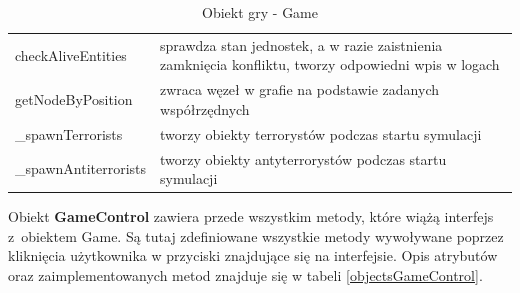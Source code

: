 \begin{table}
\begin{center}
\begin{tabular}{|p{}|p{}|}
	checkAliveEntities & sprawdza stan jednostek, a w razie zaistnienia zamknięcia konfliktu, tworzy odpowiedni wpis w logach\\
	getNodeByPosition & zwraca węzeł w grafie na podstawie zadanych współrzędnych\\
	\_spawnTerrorists & tworzy obiekty terrorystów podczas startu symulacji\\ 
	\_spawnAntiterrorists & tworzy obiekty antyterrorystów podczas startu symulacji
\\\hline
\end{tabular}
\caption {Obiekt gry - Game\label{objectsGame}}
\end{center}
\end{table} 

Obiekt \textbf{GameControl} zawiera przede wszystkim metody, które wiążą interfejs z~obiektem Game. Są tutaj zdefiniowane wszystkie metody wywoływane poprzez kliknięcia użytkownika w przyciski znajdujące się na interfejsie. Opis atrybutów oraz zaimplementowanych metod znajduje się w tabeli \ref{objectsGameControl}. 

